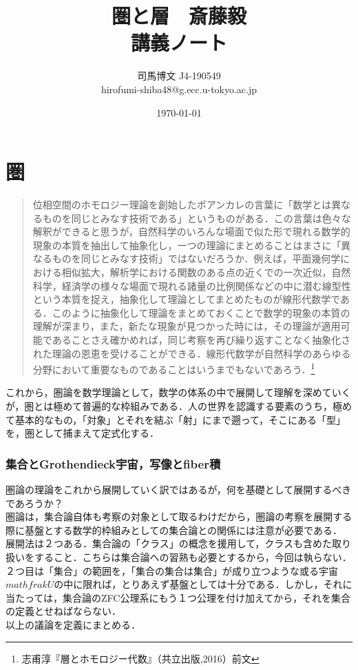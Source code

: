 \documentclass[uplatex, 12pt, a4paper, dvipdfmx]{jsarticle}
\title{圏と層　斎藤毅\\講義ノート}
\author{司馬博文 J4-190549\\hirofumi-shiba48@g.ecc.u-tokyo.ac.jp}
\date{\today}
\begin{document}
\maketitle

\part{圏}

\begin{quotation}
    位相空間のホモロジー理論を創始したポアンカレの言葉に「数学とは異なるものを同じとみなす技術である」というものがある．この言葉は色々な解釈ができると思うが，自然科学のいろんな場面で似た形で現れる数学的現象の本質を抽出して抽象化し，一つの理論にまとめることはまさに「異なるものを同じとみなす技術」ではないだろうか．例えば，平面幾何学における相似拡大，解析学における関数のある点の近くでの一次近似，自然科学，経済学の様々な場面で現れる諸量の比例関係などの中に潜む線型性という本質を捉え，抽象化して理論としてまとめたものが線形代数学である．このように抽象化して理論をまとめておくことで数学的現象の本質の理解が深まり，また，新たな現象が見つかった時には，その理論が適用可能であることさえ確かめれば，同じ考察を再び繰り返すことなく抽象化された理論の恩恵を受けることができる．線形代数学が自然科学のあらゆる分野において重要なものであることはいうまでもないであろう．\footnote{志甫淳『層とホモロジー代数』（共立出版,2016）前文}
\end{quotation}
これから，圏論を数学理論として，数学の体系の中で展開して理解を深めていくが，圏とは極めて普遍的な枠組みである．人の世界を認識する要素のうち，極めて基本的なもの，「対象」とそれを結ぶ「射」にまで遡って，そこにある「型」を，圏として捕まえて定式化する．\\

\section{集合とGrothendieck宇宙，写像とfiber積}
圏論の理論をこれから展開していく訳ではあるが，何を基礎として展開するべきであろうか？\\
圏論は，集合論自体も考察の対象として取るわけだから，圏論の考察を展開する際に基盤とする数学的枠組みとしての集合論との関係には注意が必要である．\\
展開法は２つある．集合論の「クラス」の概念を援用して，クラスも含めた取り扱いをすること．こちらは集合論への習熟も必要とするから，今回は執らない．２つ目は「集合」の範囲を，「集合の集合は集合」が成り立つような或る宇宙$mathfrak{U}$の中に限れば，とりあえず基盤としては十分である．しかし，それに当たっては，集合論のZFC公理系にもう１つ公理を付け加えてから，それを集合の定義とせねばならない．\\
以上の議論を定義にまとめる．
\end{document}
